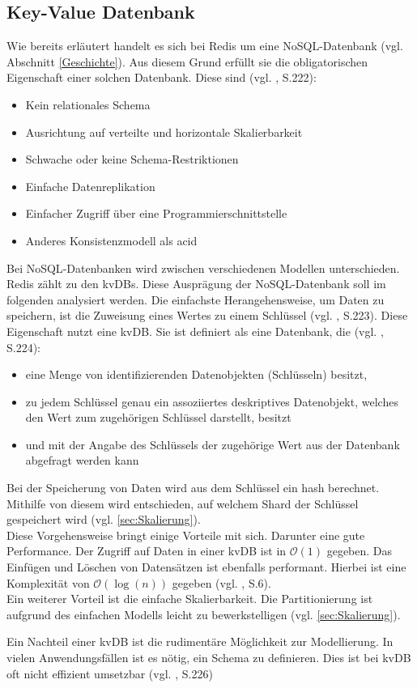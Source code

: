 
\subsection{Key-Value Datenbank}
Wie bereits erläutert handelt es sich bei \acs{Redis} um eine \acs{NoSQL}-Datenbank (vgl. Abschnitt \ref{Geschichte}). Aus diesem Grund erfüllt sie die obligatorischen Eigenschaft einer solchen Datenbank. Diese sind (vgl. \cite{1}, S.222): 
\begin{itemize}
	\item Kein relationales Schema
	\item Ausrichtung auf verteilte und horizontale Skalierbarkeit 
	\item Schwache oder keine Schema-Restriktionen 
	\item Einfache Datenreplikation 
	\item Einfacher Zugriff über eine Programmierschnittstelle
	\item Anderes Konsistenzmodell als \gls{acid}
\end{itemize}
Bei \acs{NoSQL}-Datenbanken wird zwischen verschiedenen Modellen unterschieden. \acs{Redis} zählt zu den \glspl{kvDB}. Diese Ausprägung der \acs{NoSQL}-Datenbank soll im folgenden analysiert werden. 
\newpage
Die einfachste Herangehensweise, um Daten zu speichern, ist die Zuweisung eines Wertes zu einem Schlüssel (vgl. \cite{1}, S.223). Diese Eigenschaft nutzt eine \gls{kvDB}. Sie ist definiert als eine Datenbank, die (vgl. \cite{1}, S.224):
\begin{itemize}
	\item  eine Menge von identifizierenden Datenobjekten (Schlüsseln) besitzt,
	\item  zu jedem Schlüssel genau ein assoziiertes deskriptives Datenobjekt, welches den Wert zum zugehörigen Schlüssel darstellt, besitzt
	\item und mit der Angabe des Schlüssels der zugehörige Wert aus der Datenbank abgefragt werden kann
\end{itemize}
Bei der Speicherung von Daten wird aus dem Schlüssel ein \gls{hash} berechnet. Mithilfe von diesem wird entschieden, auf welchem Shard der Schlüssel gespeichert wird \newline(vgl. \autoref{sec:Skalierung}).
\\Diese Vorgehensweise bringt einige Vorteile mit sich. Darunter eine gute Performance. Der Zugriff auf Daten in einer \gls{kvDB} ist in $\mathcal{O}(1)$ gegeben. Das Einfügen und Löschen von Datensätzen ist ebenfalls performant. Hierbei ist eine Komplexität von $\mathcal{O}(\log{(n)})$ gegeben (vgl. \cite{keyValueComp}, S.6). 
\\Ein weiterer Vorteil ist die einfache Skalierbarkeit. Die Partitionierung ist aufgrund des einfachen Modells leicht zu bewerkstelligen (vgl. \autoref{sec:Skalierung}).

Ein Nachteil einer \gls{kvDB} ist die rudimentäre Möglichkeit zur Modellierung. In vielen Anwendungsfällen ist es nötig, ein Schema zu definieren. Dies ist bei \gls{kvDB} oft nicht effizient umsetzbar (vgl. \cite{1}, S.226)